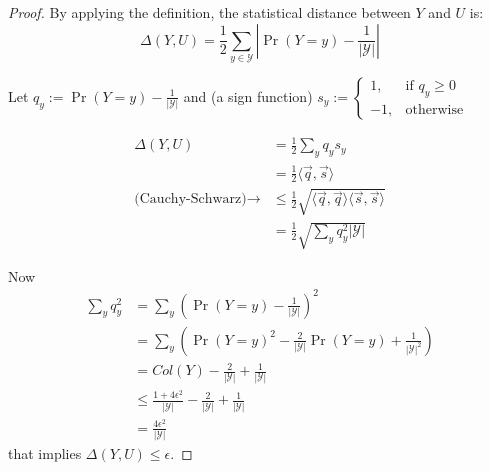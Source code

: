 \begin{proof}
    By applying the definition, the statistical distance between $Y$ and $U$ is:
    \[\Delta(Y, U) = \frac{1}{2}\sum_{\mathit{y} \in \mathcal{Y}} |\Pr(Y = \mathit{y}) - \frac{1}{|\mathcal{Y}|}|\]

    Let $q_\mathit{y}:= \Pr(Y = \mathit{y}) - \frac{1}{|\mathcal{Y}|}$ and (a sign function) $s_\mathit{y}:= \begin{cases} 1, & \mbox{if } q_\mathit{y} \geq 0 \\ -1, & \mbox{otherwise} \end{cases}$

    \begin{align*}
        \Delta(Y, U)                        & = \frac{1}{2}\sum_{\mathit{y}} q_\mathit{y} s_\mathit{y}                               \\
                                            & = \frac{1}{2}\langle \vec{q}, \vec{s}\rangle                                           \\
        \mbox{(Cauchy-Schwarz)} \rightarrow & \leq \frac{1}{2}\sqrt{\langle \vec{q}, \vec{q}\rangle \langle \vec{s}, \vec{s}\rangle} \\
                                            & = \frac{1}{2}\sqrt{\sum_{\mathit{y}} q_\mathit{y}^2 |\mathcal{Y}|}
    \end{align*}

    Now
    \begin{align*}
        \sum_\mathit{y} q_\mathit{y}^2 & = \sum_\mathit{y} (\Pr(Y=\mathit{y}) - \frac{1}{|\mathcal{Y}|})^2                                              \\
                                       & = \sum_\mathit{y} (\Pr(Y=\mathit{y})^2 - \frac{2}{|\mathcal{Y}|}\Pr(Y=\mathit{y}) + \frac{1}{|\mathcal{Y}|^2}) \\
                                       & = Col(Y) - \frac{2}{|\mathcal{Y}|} + \frac{1}{|\mathcal{Y}|}                                                   \\
                                       & \leq  \frac{1 + 4\epsilon^2}{|\mathcal{Y}|} - \frac{2}{|\mathcal{Y}|} + \frac{1}{|\mathcal{Y}|}                \\
                                       & = \frac{4\epsilon^2}{|\mathcal{Y}|}
    \end{align*}
    that implies $\Delta(Y, U) \leq \epsilon$.
\end{proof}
